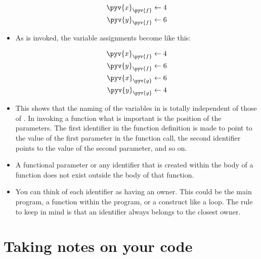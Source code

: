 \documentclass[a4paper]{article}
\begin{document}
\begin{itemize}
\begin{align*}
\pyv{x}_{\pyv{f}} \leftarrow 4\\
\pyv{y}_{\pyv{f}}\leftarrow 6
\end{align*}

\item As  is invoked, the variable assignments become like this:

\begin{align*}
\pyv{x}_{\pyv{f}} \leftarrow 4\\
\pyv{y}_{\pyv{f}}\leftarrow 6\\
\pyv{x}_{\pyv{g}} \leftarrow 6\\
\pyv{y}_{\pyv{g}}\leftarrow 4
\end{align*}

\item This shows that the naming of the variables in  is totally
independent of those of . In invoking a function what is important is the
position of the parameters. The first identifier in the function definition is
made to point to the value of the first parameter in the function call, the
second identifier points to the value of the second parameter, and so on. 

\item A functional parameter or any identifier that is created within the body
of a function does not exist outside the body of that function.

\item You can think of each identifier as having an owner. This could be the
main program, a function within the program, or a construct like a 
loop. The rule to keep in mind is that an identifier always belongs to the
closest owner. 

% 
% 


\end{itemize}

\section{Taking notes on your code}
\end{document}
